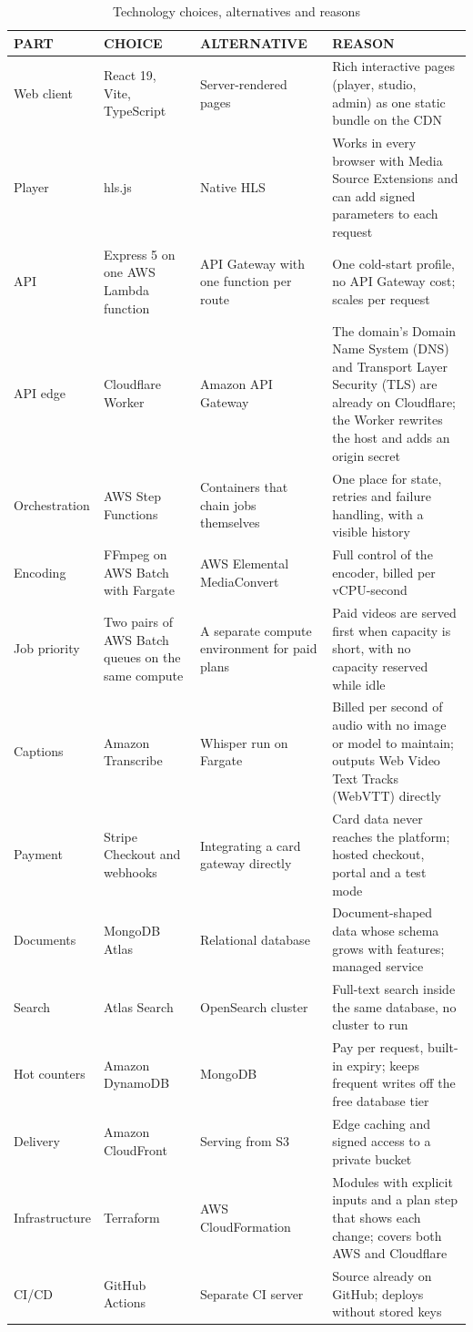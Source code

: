 \begin{table}[H]
\centering
\caption{Technology choices, alternatives and reasons}
\label{tab:tech-stack}
\small
\begin{tabularx}{\textwidth}{p{} p{} p{} X}
\toprule
\textbf{PART} & \textbf{CHOICE} & \textbf{ALTERNATIVE} & \textbf{REASON} \\
\midrule
Web client & React 19, Vite, TypeScript & Server-rendered pages & Rich interactive pages (player, studio, admin) as one static bundle on the CDN \\
Player & hls.js & Native HLS & Works in every browser with Media Source Extensions and can add signed parameters to each request \\
API & Express 5 on one AWS Lambda function & API Gateway with one function per route & One cold-start profile, no API Gateway cost; scales per request \\
API edge & Cloudflare Worker & Amazon API Gateway & The domain's Domain Name System (DNS) and Transport Layer Security (TLS) are already on Cloudflare; the Worker rewrites the host and adds an origin secret \\
Orchestration & AWS Step Functions & Containers that chain jobs themselves & One place for state, retries and failure handling, with a visible history \\
Encoding & FFmpeg on AWS Batch with Fargate & AWS Elemental MediaConvert & Full control of the encoder, billed per vCPU-second \\
Job priority & Two pairs of AWS Batch queues on the same compute & A separate compute environment for paid plans & Paid videos are served first when capacity is short, with no capacity reserved while idle \\
Captions & Amazon Transcribe & Whisper run on Fargate & Billed per second of audio with no image or model to maintain; outputs Web Video Text Tracks (WebVTT) directly \\
Payment & Stripe Checkout and webhooks & Integrating a card gateway directly & Card data never reaches the platform; hosted checkout, portal and a test mode \\
Documents & MongoDB Atlas & Relational database & Document-shaped data whose schema grows with features; managed service \\
Search & Atlas Search & OpenSearch cluster & Full-text search inside the same database, no cluster to run \\
Hot counters & Amazon DynamoDB & MongoDB & Pay per request, built-in expiry; keeps frequent writes off the free database tier \\
Delivery & Amazon CloudFront & Serving from S3 & Edge caching and signed access to a private bucket \\
Infrastructure & Terraform & AWS CloudFormation & Modules with explicit inputs and a plan step that shows each change; covers both AWS and Cloudflare \\
CI/CD & GitHub Actions & Separate CI server & Source already on GitHub; deploys without stored keys \\
\bottomrule
\end{tabularx}
\end{table}

